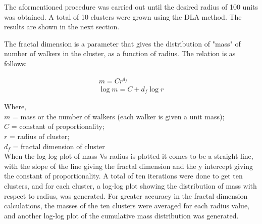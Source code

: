 \documentclass[a4paper,12pt]{article}
\begin{document}
\indent The aformentioned procedure was carried out until the desired radius of 100 units was obtained.  A total of 10 clusters were grown using the DLA method.  The
results are shown in the next section.


\indent The fractal dimension is a parameter that gives the distribution of "mass" of number of walkers in the cluster, as a function of radius. 
The relation is as follows:


\begin{eqnarray}	
	m = C r^{d_f} \\
	\log{m} = C + d_f\log{r}
\end{eqnarray}\label{fractal dimension}

Where, \\
$m$ = mass or the number of walkers (each walker is given a unit mass);\\
$C$ = constant of proportionality; \\
$r$ = radius of cluster; \\
$d_f$ = fractal dimension of cluster \\

\indent When the log-log plot of mass Vs radius is plotted it comes to be a straight line, with the slope of the line giving the fractal dimension and the y intercept giving the constant of proportionality. 
A total of ten iterations were done to get ten clusters, and for each cluster, a log-log plot showing the distribution of mass with respect to radius, was generated. For greater accuracy in the fractal dimension
calculations, the masses of the ten clusters were averaged for each radius value, and another log-log plot of the cumulative mass distribution was generated.
\end{document}

